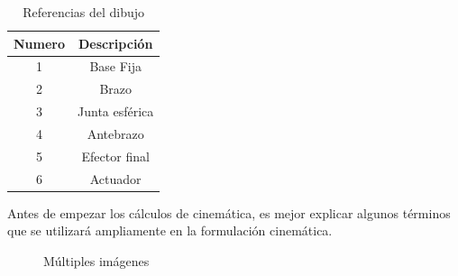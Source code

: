         
        \begin{table}[h]
            \centering
            \begin{tabular}{c c}
            \hline
                \textbf{Numero}& \textbf{Descripción} \\ 
            \hline             \hline
             1 & Base Fija \\
            \hline
             2 & Brazo \\
            \hline
             3 & Junta esférica \\
            \hline
             4 & Antebrazo\\
            \hline
             5 & Efector final \\
             \hline
             6 & Actuador \\
             \hline
            \end{tabular}
           \caption{Referencias del dibujo}
           \label{tab:cap4_tabla_11}
        \end{table}
        
        
        \newpage

        Antes de empezar los cálculos de cinemática, es mejor explicar algunos términos que se utilizará ampliamente en la formulación cinemática.
        
        
         \begin{figure}[htb]
             \centering
             \caption{Múltiples imágenes}
             \label{f:Cap4_Metodo_B_Modelacion_Cinematica_Posicion_2}
        \end{figure}
        
